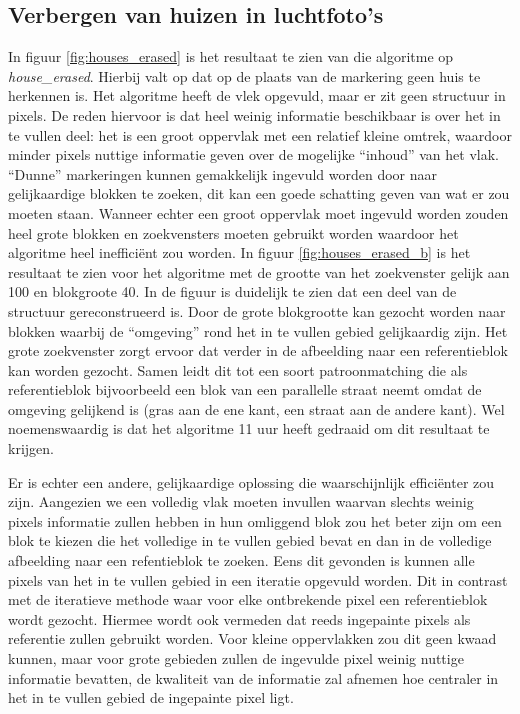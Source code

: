 \documentclass[titlepage]{article}
\begin{document}
\subsection{Verbergen van huizen in luchtfoto's}
In figuur \ref{fig:houses_erased} is het resultaat te zien van die algoritme op \textit{house\_erased}. 
Hierbij valt op dat op de plaats van de markering geen huis te herkennen is. Het algoritme heeft de vlek opgevuld, maar er zit geen structuur in pixels. De reden hiervoor is dat heel weinig informatie beschikbaar is over het in te vullen deel: het is een groot oppervlak met een relatief kleine omtrek, waardoor minder pixels nuttige informatie geven over de mogelijke ``inhoud'' van het vlak. ``Dunne'' markeringen kunnen gemakkelijk ingevuld worden door naar gelijkaardige blokken te zoeken, dit kan een goede schatting geven van wat er zou moeten staan. Wanneer echter een groot oppervlak moet ingevuld worden zouden heel grote blokken en zoekvensters moeten gebruikt worden waardoor het algoritme heel ineffici\"ent zou worden. In figuur \ref{fig:houses_erased_b} is het resultaat te zien voor het algoritme met de grootte van het zoekvenster gelijk aan 100 en blokgroote 40. In de figuur is duidelijk te zien dat een deel van de structuur gereconstrueerd is. Door de grote blokgrootte kan gezocht worden naar blokken waarbij de ``omgeving'' rond het in te vullen gebied gelijkaardig zijn. Het grote zoekvenster zorgt ervoor dat verder in de afbeelding naar een referentieblok kan worden gezocht. Samen leidt dit tot een soort patroonmatching die als referentieblok bijvoorbeeld een blok van een parallelle straat neemt omdat de omgeving gelijkend is (gras aan de ene kant, een straat aan de andere kant). Wel noemenswaardig is dat het algoritme 11 uur heeft gedraaid om dit resultaat te krijgen.
\par
Er is echter een andere, gelijkaardige oplossing die waarschijnlijk effici\"enter zou zijn. Aangezien we een volledig vlak moeten invullen waarvan slechts weinig pixels informatie zullen hebben in hun omliggend blok zou het beter zijn om een blok te kiezen die het volledige in te vullen gebied bevat en dan in de volledige afbeelding naar een refentieblok te zoeken. Eens dit gevonden is kunnen alle pixels van het in te vullen gebied in een iteratie opgevuld worden. Dit in contrast met de iteratieve methode waar voor elke ontbrekende pixel een referentieblok wordt gezocht. Hiermee wordt ook vermeden dat reeds ingepainte pixels als referentie zullen gebruikt worden. Voor kleine oppervlakken zou dit geen kwaad kunnen, maar voor grote gebieden zullen de ingevulde pixel weinig nuttige informatie bevatten, de kwaliteit van de informatie zal afnemen hoe centraler in het in te vullen gebied de ingepainte pixel ligt.
\end{document}
